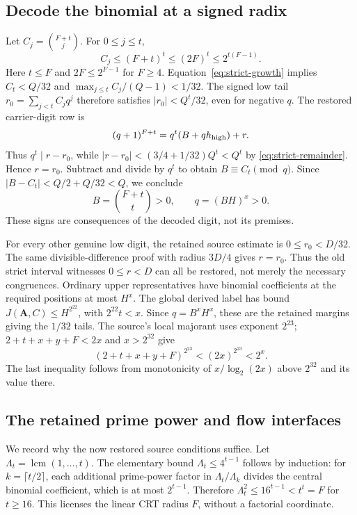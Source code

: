 \subsection{Decode the binomial at a signed radix}
Let $C_j=\binom{F+t}{j}$. For $0\le j\le t$,
\[
 C_j\le(F+t)^t\le(2F)^t\le2^{t(F-1)}.
\]
Here $t\le F$ and $2F\le2^{F-1}$ for $F\ge4$.
Equation~\eqref{eq:strict-growth} implies
$C_t<Q/32$ and $\max_{j\le t}C_j/(Q-1)<1/32$.
The signed low tail $r_0=\sum_{j<t}C_jq^j$ therefore satisfies
$|r_0|<Q^t/32$, even for negative $q$.
The restored carrier-digit row is
\[
 (q+1)^{F+t}=q^t(B+q h_{\rm high})+r.
\]
Thus $q^t\mid r-r_0$, while
$|r-r_0|<(3/4+1/32)Q^t<Q^t$ by
\eqref{eq:strict-remainder}. Hence $r=r_0$.
Subtract and divide by $q^t$ to obtain $B\equiv C_t\pmod q$.
Since $|B-C_t|<Q/2+Q/32<Q$, we conclude
\begin{equation}\label{eq:strict-binomial}
 B=\binom{F+t}{t}>0,\qquad q=(BH)^x>0.
\end{equation}
These signs are consequences of the decoded digit, not its premises.

For every other genuine low digit, the retained source estimate is
$0\le r_0<D/32$. The same divisible-difference proof with radius
$3D/4$ gives $r=r_0$. Thus the old strict interval witnesses
$0\le r<D$ can all be restored, not merely the necessary congruences.
Ordinary upper representatives have binomial coefficients at the required
positions at most $H^x$. The global derived label has bound
$J(\boldsymbol A,C)\le H^{2^{22}}$, with $2^{22}t<x$.
Since $q=B^xH^x$, these are the retained margins giving the $1/32$
tails. The source's local majorant uses exponent $2^{23}$;
$2+t+x+y+F<2x$ and $x>2^{32}$ give
\[
 (2+t+x+y+F)^{2^{23}}<(2x)^{2^{23}}<2^x.
\]
The last inequality follows from monotonicity of
$x/\log_2(2x)$ above $2^{32}$ and its value there.

\subsection{The retained prime power and flow interfaces}
We record why the now restored source conditions suffice.
Let $\Lambda_t=\operatorname{lcm}(1,\ldots,t)$.
The elementary bound $\Lambda_t\le4^{t-1}$ follows by induction:
for $k=\lceil t/2\rceil$, each additional prime-power factor in
$\Lambda_t/\Lambda_k$ divides the central binomial coefficient,
which is at most $2^{t-1}$. Therefore
$\Lambda_t^2\le16^{t-1}<t^t=F$ for $t\ge16$.
This licenses the linear CRT radius $F$, without a factorial coordinate.


